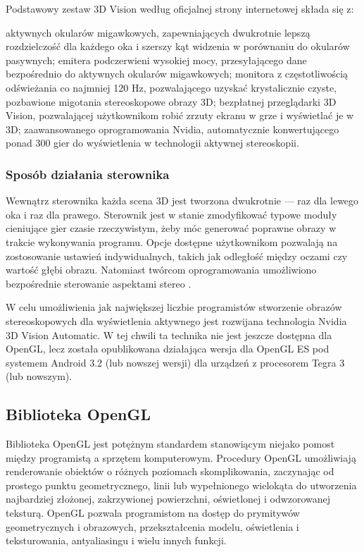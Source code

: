Podstawowy zestaw 3D Vision według oficjalnej strony internetowej \cite{3dVisionInfo} składa się z: 
\begin{itemize}
\itemi aktywnych okularów migawkowych, zapewniających dwukrotnie lepszą rozdzielczość dla każdego oka i szerszy kąt widzenia w porównaniu do okularów pasywnych;
\itemi emitera podczerwieni wysokiej mocy, przesyłającego dane bezpośrednio do aktywnych okularów migawkowych;
\itemi monitora z częstotliwością odświeżania co najmniej 120 Hz, pozwalającego uzyskać krystalicznie czyste, pozbawione migotania stereoskopowe obrazy 3D;
\itemi bezpłatnej przeglądarki 3D Vision, pozwalającej użytkownikom robić zrzuty ekranu w grze i wyświetlać je w 3D;
\itemi zaawansowanego oprogramowania Nvidia, automatycznie konwertującego ponad 300 gier do wyświetlenia w technologii aktywnej stereoskopii. 
\end{itemize}

\subsubsection{Sposób działania sterownika}
Wewnątrz sterownika każda scena 3D jest tworzona dwukrotnie --- raz dla lewego oka i raz dla prawego. Sterownik jest w stanie zmodyfikować typowe moduły cieniujące gier czasie rzeczywistym, żeby móc generować poprawne obrazy w trakcie wykonywania programu. Opcje dostępne użytkownikom pozwalają na zostosowanie ustawień indywidualnych, takich jak odległość między oczami czy wartość głębi obrazu. Natomiast twórcom oprogramowania umożliwiono bezpośrednie sterowanie aspektami stereo \cite{3dVisionInfo}.

W celu umożliwienia jak największej liczbie programistów stworzenie obrazów stereoskopowych dla wyświetlenia aktywnego jest rozwijana technologia Nvidia 3D Vision Automatic. W tej chwili ta technika nie jest jeszcze dostępna dla OpenGL, lecz została opublikowana działająca wersja dla OpenGL ES pod systemem Android 3.2 (lub nowszej wersji) dla urządzeń z procesorem Tegra 3 (lub nowszym).

\subsection{Biblioteka OpenGL}
Biblioteka OpenGL jest potężnym standardem stanowiącym niejako pomost między programistą a sprzętem komputerowym. Procedury OpenGL umożliwiają renderowanie obiektów o różnych poziomach skomplikowania, zaczynając od prostego punktu geometrycznego, linii lub wypełnionego wielokąta do utworzenia najbardziej złożonej, zakrzywionej powierzchni, oświetlonej i odwzorowanej teksturą. OpenGL pozwala programistom na dostęp do prymitywów geometrycznych i obrazowych, przekształcenia modelu, oświetlenia i teksturowania, antyaliasingu i wielu innych funkcji. 

